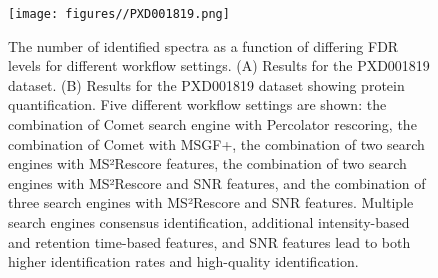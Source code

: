 \documentclass[12pt]{article}
\begin{document}
\begin{figure}[ht!]
	\centering
	\texttt{[image: figures//PXD001819.png]}
	\caption{The number of identified spectra as a function of differing FDR levels for different workflow settings. (A) Results for the PXD001819 dataset. (B) Results for the PXD001819 dataset showing protein quantification. Five different workflow settings are shown: the combination of Comet search engine with Percolator rescoring, the combination of Comet with MSGF+, the combination of two search engines with MS²Rescore features, the combination of two search engines with MS²Rescore and SNR features, and the combination of three search engines with MS²Rescore and SNR features. Multiple search engines consensus identification, additional intensity-based and retention time-based features, and SNR features lead to both higher identification rates and high-quality identification.}
	\label{fig:PXD001819_ms2rescore_pic}
\end{figure}
\end{document}
